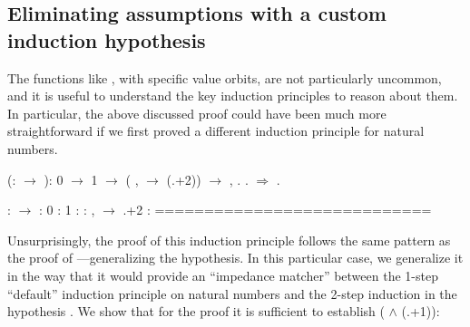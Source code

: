 \subsection{Eliminating assumptions with a custom induction hypothesis}




The functions like , with specific value orbits, are not
particularly uncommon, and it is useful to understand the key
induction principles to reason about them. In particular, the above
discussed proof could have been much more straightforward if we first
proved a different induction principle  for natural numbers.


\begin{coqdoccode}
\coqdocemptyline
\coqdocnoindent
{}  (:  \ensuremath{\rightarrow} ): \coqdoceol
\coqdocindent{1.00em}
 0 \ensuremath{\rightarrow}  1 \ensuremath{\rightarrow} (\coqdockw{\ensuremath{\forall}} ,   \ensuremath{\rightarrow}  (.+2)) \ensuremath{\rightarrow} \coqdockw{\ensuremath{\forall}} ,  .\coqdoceol
\coqdocnoindent
{}.\coqdoceol
\coqdocnoindent
{}\ensuremath{\Rightarrow}    .\coqdoceol
\coqdocemptyline
\end{coqdoccode}


\coqdoceol
\coqdocemptyline
\coqdocindent{1.00em}
 :  \ensuremath{\rightarrow} \coqdoceol
\coqdocindent{1.00em}
 :  0\coqdoceol
\coqdocindent{1.00em}
 :  1\coqdoceol
\coqdocindent{1.00em}
 : \coqdockw{\ensuremath{\forall}}  : ,   \ensuremath{\rightarrow}  .+2\coqdoceol
\coqdocindent{1.00em}
 : \coqdoceol
\coqdocindent{1.00em}
============================\coqdoceol
\coqdocindent{1.50em}
 

\coqdocemptyline


Unsurprisingly, the proof of this induction principle follows the same
pattern as the proof of ---generalizing the hypothesis. In
this particular case, we generalize it in the way that it would
provide an ``impedance matcher'' between the 1-step ``default'' induction
principle on natural numbers and the 2-step induction in the
hypothesis . We show that for the proof it is sufficient to
establish (  \ensuremath{\land}  (.+1)):


